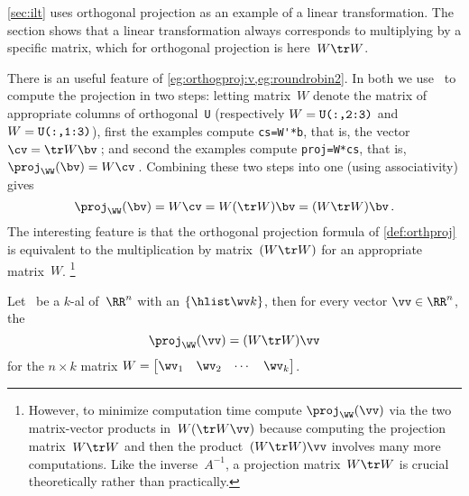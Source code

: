 \begin{aside}
\cref{sec:ilt} uses orthogonal projection as an example of a linear transformation. 
The section shows that a linear transformation always corresponds to multiplying by a specific matrix, which for orthogonal projection is here~\(W\tr W\).
\end{aside}
There is an useful feature of \cref{eg:orthogproj:v,eg:roundrobin2}.
In both we use \script\ to compute the projection in two steps: 
letting matrix~\(W\) denote the matrix of appropriate columns of orthogonal~\verb|U| (respectively \(W=\verb|U(:,2:3)|\) and \(W=\verb|U(:,1:3)|\)), first the examples compute \verb|cs=W'*b|, that is, the vector \(\cv=\tr W\bv\)\,; and second the examples compute \verb|proj=W*cs|, that is, \(\proj_\WW(\bv)=W\cv\)\,.
Combining these two steps into one (using associativity) gives
\begin{equation*}
\proj_\WW(\bv)=W\cv=W(\tr W)\bv=(W\tr W)\bv\,.
\end{equation*}
The interesting feature is that the orthogonal projection formula of \cref{def:orthproj} is equivalent to the multiplication by matrix~\((W\tr W)\) for an appropriate matrix~\(W\).%
\footnote{However, to minimize computation time compute \(\proj_\WW(\vv)\) via the two matrix-vector products in~\(W(\tr W\vv)\) because computing the projection matrix~\(W\tr W\) and then the product~\((W\tr W)\vv\) involves many more computations.  Like the inverse~\(A^{-1}\), a projection matrix~\(W\tr W\) is crucial theoretically  rather than practically.}



\begin{theorem} \label{thm:projmat}
Let \WW\ be a \(k\)-al  of~\(\RR^n\) with an  \(\{\hlist\wv k\}\), then for every vector \(\vv\in\RR^n\), the 
\begin{equation}
\proj_\WW(\vv)=(W\tr W)\vv
\end{equation}
for the \(n\times k\) matrix \(W=\begin{bmatrix} \wv_1&\wv_2&\cdots&\wv_k \end{bmatrix}\).
\end{theorem}

